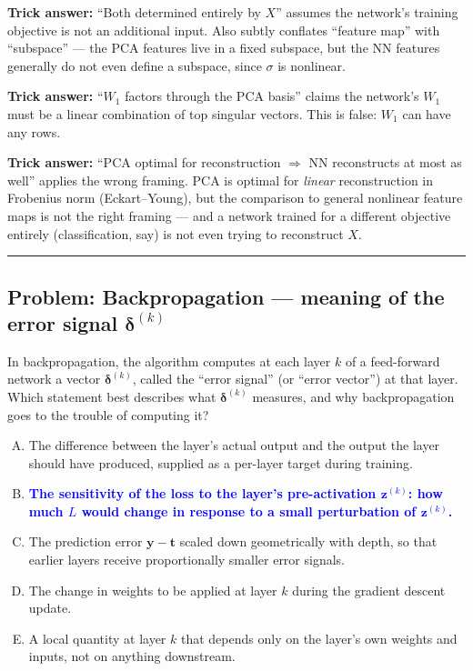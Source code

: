 \documentclass[12pt]{amsart}
\newcommand{\divider}{
  \vspace{-1em}
  \noindent
  \raisebox{-0.15ex}{\textbullet}%
  \hspace{0.5em}%
  \rule[0.5ex]{0.95\textwidth}{1.0pt}%
  \hspace{0.5em}%
  \raisebox{-0.15ex}{\textbullet}%
  \vspace{0em}
}
\begin{document}
\textbf{Trick answer:}
``Both determined entirely by $X$'' assumes the network's training objective
is not an additional input. Also subtly conflates ``feature map'' with
``subspace'' --- the PCA features live in a fixed subspace, but the NN
features generally do not even define a subspace, since $\sigma$ is nonlinear.

\textbf{Trick answer:}
``$W_1$ factors through the PCA basis'' claims the network's $W_1$ must be
a linear combination of top singular vectors. This is false: $W_1$ can have
any rows.

\textbf{Trick answer:}
``PCA optimal for reconstruction $\Rightarrow$ NN reconstructs at most as
well'' applies the wrong framing. PCA is optimal for \emph{linear}
reconstruction in Frobenius norm (Eckart--Young), but the comparison to
general nonlinear feature maps is not the right framing --- and a network
trained for a different objective entirely (classification, say) is not even
trying to reconstruct $X$.

\divider

\subsection*{Problem: Backpropagation --- meaning of the error signal $\boldsymbol{\delta}^{(k)}$}

In backpropagation, the algorithm computes at each layer $k$ of a feed-forward
network a vector $\boldsymbol{\delta}^{(k)}$, called the ``error signal''
(or ``error vector'') at that layer. Which statement best describes what
$\boldsymbol{\delta}^{(k)}$ measures, and why backpropagation goes to the
trouble of computing it?

\begin{enumerate}[(A)]
\item The difference between the layer's actual output and the output the layer
should have produced, supplied as a per-layer target during training.
\item \textcolor{blue}{\textbf{The sensitivity of the loss to the layer's pre-activation $\mathbf{z}^{(k)}$: how much $L$ would change in response to a small perturbation of $\mathbf{z}^{(k)}$.}}
\item The prediction error $\mathbf{y} - \mathbf{t}$ scaled down geometrically
with depth, so that earlier layers receive proportionally smaller error signals.
\item The change in weights to be applied at layer $k$ during the gradient
descent update.
\item A local quantity at layer $k$ that depends only on the layer's own weights
and inputs, not on anything downstream.
\end{enumerate}
\end{document}
